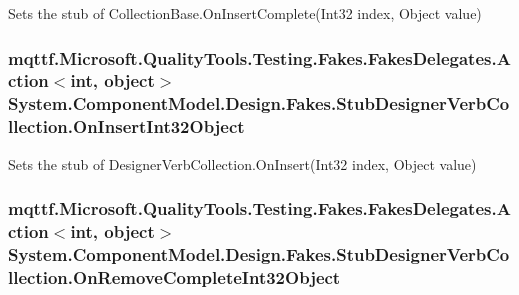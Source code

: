 Sets the stub of Collection\-Base.\-On\-Insert\-Complete(\-Int32 index, Object value)

\hypertarget{class_system_1_1_component_model_1_1_design_1_1_fakes_1_1_stub_designer_verb_collection_a77aa1984d8c21ccc207e880c4b84de55}{
\subsubsection[{On\-Insert\-Int32\-Object}]{\setlength{\rightskip}{0pt plus 5cm}mqttf.\-Microsoft.\-Quality\-Tools.\-Testing.\-Fakes.\-Fakes\-Delegates.\-Action$<$int, object$>$ System.\-Component\-Model.\-Design.\-Fakes.\-Stub\-Designer\-Verb\-Collection.\-On\-Insert\-Int32\-Object}}\label{class_system_1_1_component_model_1_1_design_1_1_fakes_1_1_stub_designer_verb_collection_a77aa1984d8c21ccc207e880c4b84de55}


Sets the stub of Designer\-Verb\-Collection.\-On\-Insert(\-Int32 index, Object value)

\hypertarget{class_system_1_1_component_model_1_1_design_1_1_fakes_1_1_stub_designer_verb_collection_a0e08ed78ae7fcc37deea23cc8e082843}{
\subsubsection[{On\-Remove\-Complete\-Int32\-Object}]{\setlength{\rightskip}{0pt plus 5cm}mqttf.\-Microsoft.\-Quality\-Tools.\-Testing.\-Fakes.\-Fakes\-Delegates.\-Action$<$int, object$>$ System.\-Component\-Model.\-Design.\-Fakes.\-Stub\-Designer\-Verb\-Collection.\-On\-Remove\-Complete\-Int32\-Object}}\label{class_system_1_1_component_model_1_1_design_1_1_fakes_1_1_stub_designer_verb_collection_a0e08ed78ae7fcc37deea23cc8e082843}


